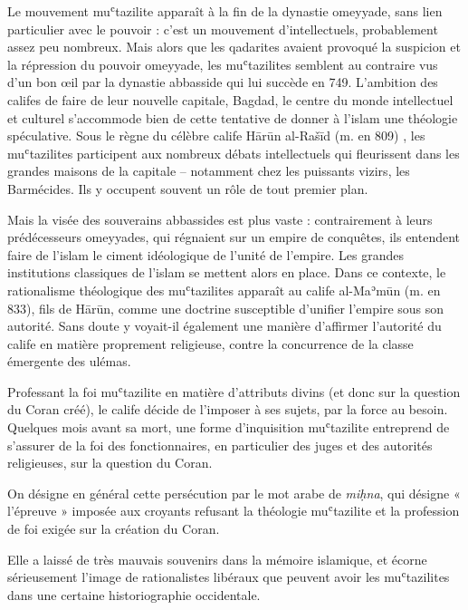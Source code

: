 Le mouvement muʿtazilite apparaît à la fin de la dynastie omeyyade, sans
lien particulier avec le pouvoir : c'est un mouvement d'intellectuels,
probablement assez peu nombreux. Mais alors que les qadarites avaient
provoqué la suspicion et la répression du pouvoir omeyyade, les
muʿtazilites semblent au contraire vus d'un bon œil par la dynastie
abbasside qui lui succède en 749. L'ambition des califes de faire de
leur nouvelle capitale, Bagdad, le centre du monde intellectuel et
culturel s'accommode bien de cette tentative de donner à l'islam une
théologie spéculative. Sous le règne du célèbre calife Hārūn al-Rašīd
(m. en 809) , les muʿtazilites participent aux nombreux débats
intellectuels qui fleurissent dans les grandes maisons de la capitale --
notamment chez les puissants vizirs, les Barmécides. Ils y occupent
souvent un rôle de tout premier plan.

Mais la visée des souverains abbassides est plus vaste : contrairement à
leurs prédécesseurs omeyyades, qui régnaient sur un empire de conquêtes,
ils entendent faire de l'islam le ciment idéologique de l'unité de
l'empire. Les grandes institutions classiques de l'islam se mettent
alors en place. Dans ce contexte, le rationalisme théologique des
muʿtazilites apparaît au calife al-Maʾmūn (m. en 833), fils de Hārūn,
comme une doctrine susceptible d'unifier l'empire sous son autorité.
Sans doute y voyait-il également une manière d'affirmer l'autorité du
calife en matière proprement religieuse, contre la concurrence de la
classe émergente des ulémas.

Professant la foi muʿtazilite en matière d'attributs divins (et donc sur
la question du Coran créé), le calife décide de l'imposer à ses sujets,
par la force au besoin. Quelques mois
avant sa mort, une forme d'inquisition muʿtazilite entreprend de
s'assurer de la foi des fonctionnaires, en particulier des juges et des
autorités religieuses, sur la question du Coran.
\begin{Def}[miḥna]
On désigne en général
cette persécution par le mot arabe de \emph{miḥna}, qui désigne «
l'épreuve » imposée aux croyants refusant la théologie muʿtazilite et la
profession de foi exigée sur la création du Coran. 
\end{Def}  Elle a laissé de très
mauvais souvenirs dans la mémoire islamique, et écorne sérieusement
l'image de rationalistes libéraux que peuvent avoir les muʿtazilites
dans une certaine historiographie occidentale.

